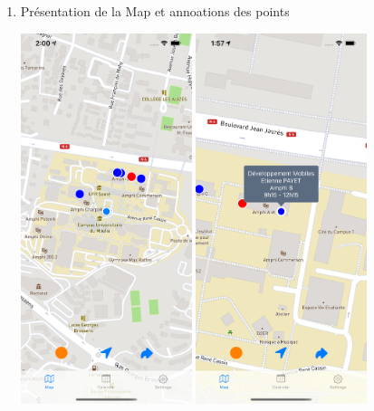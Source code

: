 \documentclass{article}
\begin{document}
\begin{enumerate}
\item Présentation de la Map et annoations des points
    \begin{center}
        \includegraphics[width=50mm, scale=0.5]{map.png}
        \includegraphics[width=50mm, scale=0.5]{pointAnnotation.png}
    \end{center}


\end{enumerate}
\end{document}
